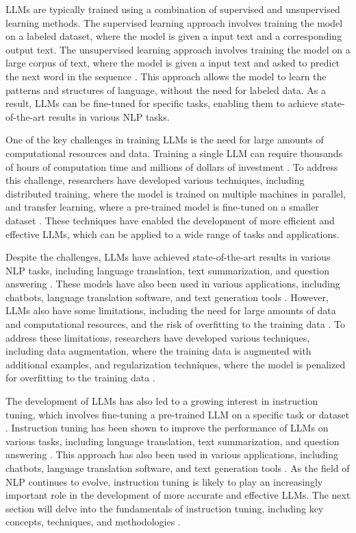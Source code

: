 \documentclass[11pt]{article}
\begin{document}
LLMs are typically trained using a combination of supervised and unsupervised learning methods. The supervised learning approach involves training the model on a labeled dataset, where the model is given a input text and a corresponding output text. The unsupervised learning approach involves training the model on a large corpus of text, where the model is given a input text and asked to predict the next word in the sequence \cite{ref2}. This approach allows the model to learn the patterns and structures of language, without the need for labeled data. As a result, LLMs can be fine-tuned for specific tasks, enabling them to achieve state-of-the-art results in various NLP tasks.

One of the key challenges in training LLMs is the need for large amounts of computational resources and data. Training a single LLM can require thousands of hours of computation time and millions of dollars of investment \cite{ref26}. To address this challenge, researchers have developed various techniques, including distributed training, where the model is trained on multiple machines in parallel, and transfer learning, where a pre-trained model is fine-tuned on a smaller dataset \cite{ref27}. These techniques have enabled the development of more efficient and effective LLMs, which can be applied to a wide range of tasks and applications.

Despite the challenges, LLMs have achieved state-of-the-art results in various NLP tasks, including language translation, text summarization, and question answering \cite{ref28}. These models have also been used in various applications, including chatbots, language translation software, and text generation tools \cite{ref7}. However, LLMs also have some limitations, including the need for large amounts of data and computational resources, and the risk of overfitting to the training data \cite{ref29}. To address these limitations, researchers have developed various techniques, including data augmentation, where the training data is augmented with additional examples, and regularization techniques, where the model is penalized for overfitting to the training data \cite{ref30}.

The development of LLMs has also led to a growing interest in instruction tuning, which involves fine-tuning a pre-trained LLM on a specific task or dataset \cite{ref8}. Instruction tuning has been shown to improve the performance of LLMs on various tasks, including language translation, text summarization, and question answering \cite{ref31}. This approach has also been used in various applications, including chatbots, language translation software, and text generation tools \cite{ref7}. As the field of NLP continues to evolve, instruction tuning is likely to play an increasingly important role in the development of more accurate and effective LLMs. The next section will delve into the fundamentals of instruction tuning, including key concepts, techniques, and methodologies \cite{ref32}.
\end{document}
